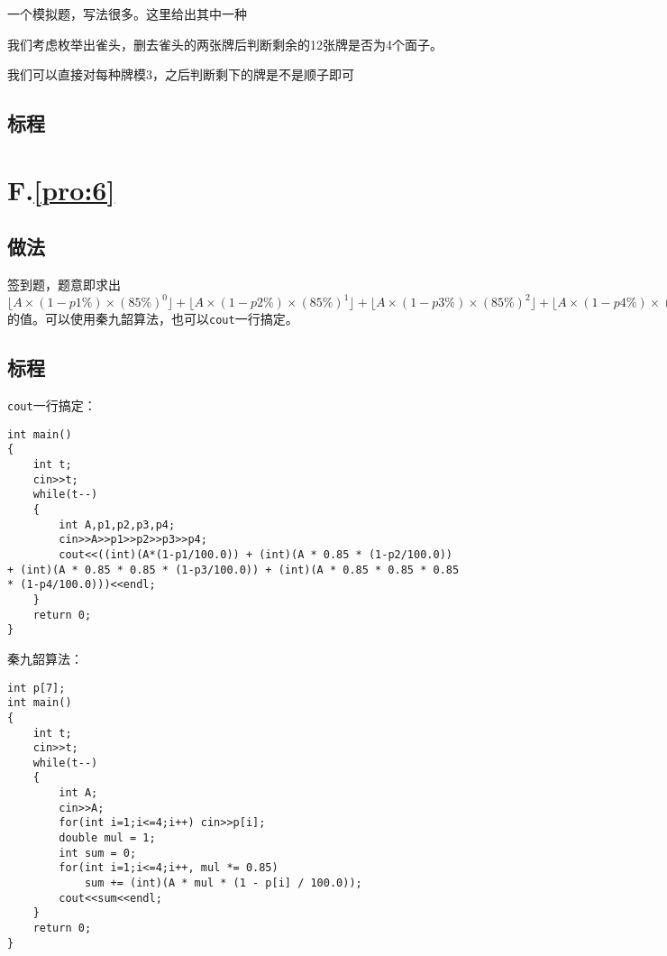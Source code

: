 \documentclass[
	lang=cn,
	color=blue
]{elegantbook}
\begin{document}
一个模拟题，写法很多。这里给出其中一种

我们考虑枚举出雀头，删去雀头的两张牌后判断剩余的12张牌是否为4个面子。

我们可以直接对每种牌模3，之后判断剩下的牌是不是顺子即可

\section*{标程}

\chapter*{F.\quad \ref*{pro:6}}
\section*{做法}
签到题，题意即求出$\lfloor A \times (1-p1\%) \times (85\%)^0 \rfloor + \lfloor A \times (1-p2\%) \times (85\%)^1 \rfloor + \lfloor A \times (1-p3\%) \times (85\%)^2 \rfloor + \lfloor A \times (1-p4\%) \times (85\%)^3 \rfloor$的值。可以使用秦九韶算法，也可以\lstinline{cout}一行搞定。

\section*{标程}
\lstinline{cout}一行搞定：
\begin{lstlisting}
int main()
{
    int t;
    cin>>t;
    while(t--)
    {
        int A,p1,p2,p3,p4;
        cin>>A>>p1>>p2>>p3>>p4;
        cout<<((int)(A*(1-p1/100.0)) + (int)(A * 0.85 * (1-p2/100.0)) + (int)(A * 0.85 * 0.85 * (1-p3/100.0)) + (int)(A * 0.85 * 0.85 * 0.85 * (1-p4/100.0)))<<endl;
    }
    return 0;
}
\end{lstlisting}

秦九韶算法：
\begin{lstlisting}
int p[7];
int main()
{
    int t;
    cin>>t;
    while(t--)
    {
        int A;
        cin>>A;
        for(int i=1;i<=4;i++) cin>>p[i];
        double mul = 1;
        int sum = 0;
        for(int i=1;i<=4;i++, mul *= 0.85)
            sum += (int)(A * mul * (1 - p[i] / 100.0));
        cout<<sum<<endl;
    }
    return 0;
}
\end{lstlisting}
\end{document}

